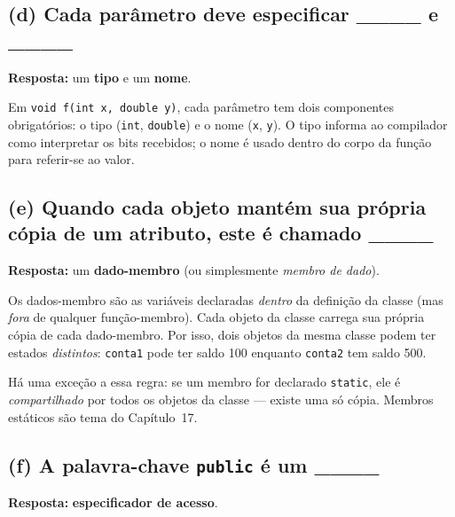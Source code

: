 \documentclass[11pt,a4paper]{article}
\begin{document}
\subsection*{(d) Cada par\^ametro deve especificar ____ e ____}

\begin{resposta}\textbf{Resposta:} um \textbf{tipo} e um \textbf{nome}.\end{resposta}

Em \texttt{void f(int x, double y)}, cada par\^ametro tem dois componentes obrigat\'orios: o tipo (\texttt{int}, \texttt{double}) e o nome (\texttt{x}, \texttt{y}). O tipo informa ao compilador como interpretar os bits recebidos; o nome \'e usado dentro do corpo da fun\c{c}\~ao para referir-se ao valor.

\subsection*{(e) Quando cada objeto mant\'em sua pr\'opria c\'opia de um atributo, este \'e chamado ____}

\begin{resposta}\textbf{Resposta:} um \textbf{dado-membro} (ou simplesmente \emph{membro de dado}).\end{resposta}

Os dados-membro s\~ao as vari\'aveis declaradas \emph{dentro} da defini\c{c}\~ao da classe (mas \emph{fora} de qualquer fun\c{c}\~ao-membro). Cada objeto da classe carrega sua pr\'opria c\'opia de cada dado-membro. Por isso, dois objetos da mesma classe podem ter estados \emph{distintos}: \texttt{conta1} pode ter saldo 100 enquanto \texttt{conta2} tem saldo 500.

\begin{obseng}
H\'a uma exce\c{c}\~ao a essa regra: se um membro for declarado \texttt{static}, ele \'e \emph{compartilhado} por todos os objetos da classe --- existe uma s\'o c\'opia. Membros est\'aticos s\~ao tema do Cap\'itulo~17.
\end{obseng}

\subsection*{(f) A palavra-chave \texttt{public} \'e um ____}

\begin{resposta}\textbf{Resposta:} \textbf{especificador de acesso}.\end{resposta}
\end{document}
